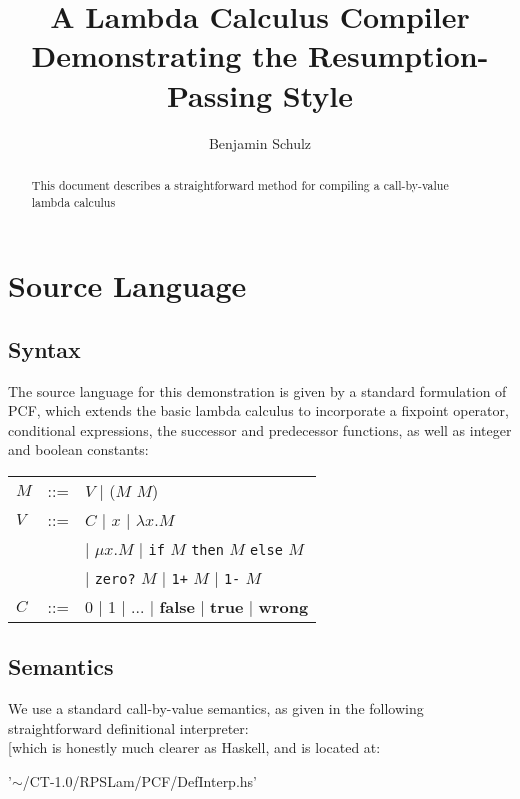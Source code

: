 \documentclass[a4paper,10pt]{article}
\title{A Lambda Calculus Compiler Demonstrating the Resumption-Passing Style}
\author{Benjamin Schulz}
\begin{document}
\maketitle

\begin{abstract}

This document describes a straightforward method for compiling a call-by-value lambda calculus 

\end{abstract}

\section{Source Language}

\subsection{Syntax}

The source language for this demonstration is given by a standard formulation of PCF, which extends the basic lambda calculus to incorporate a fixpoint operator, conditional expressions, the successor and predecessor functions, as well as integer and boolean constants:\\

\begin{tabular}[t]{lll}
$M$ &::=& $V$ $\vert$ ($M$ $M$)\\
$V$ &::=& $C$ $\vert$ $x$ $\vert$ $\lambda x.M$\\
          &&$\vert$ $\mu x.M$ $\vert$ \texttt{if} $M$ \texttt{then} $M$ \texttt{else} $M$\\
          &&$\vert$ \texttt{zero?} $M$ $\vert$ \texttt{1+} $M$ $\vert$ \texttt{1-} $M$\\
$C$ &::=& 0 $\vert$ 1 $\vert$ ... $\vert$ \textbf{false} $\vert$ \textbf{true} $\vert$ \textbf{wrong}\\
\end{tabular}


\subsection{Semantics}

We use a standard call-by-value semantics, as given in the following straightforward definitional interpreter:\\

[which is honestly much clearer as Haskell, and is located at:

	'$\sim$/CT-1.0/RPSLam/PCF/DefInterp.hs'
\end{document}
